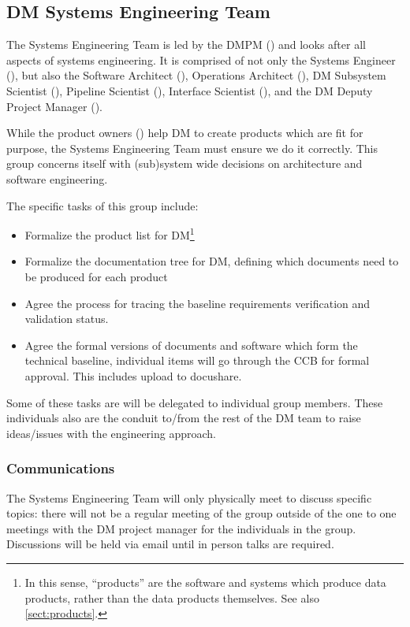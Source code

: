 \subsection{DM Systems Engineering Team \label{sect:sysengt}}

The Systems Engineering Team is led by the DMPM () and looks after all aspects of systems engineering.
It is comprised of not only the Systems Engineer (), but also the Software Architect (), Operations Architect (), DM Subsystem Scientist (), Pipeline Scientist (), Interface Scientist (), and the DM Deputy Project Manager ().

While the product owners () help DM to create products which are fit for purpose, the Systems Engineering Team must ensure we do it correctly. This group concerns itself with (sub)system wide decisions on architecture and software engineering.

The specific tasks of this group include:

\begin{itemize}
\item Formalize the product list for DM\footnote{In this sense, ``products'' are the software and systems which produce data products, rather than the data products themselves. See also \ref{sect:products}.}
\item Formalize the documentation tree for DM, defining which documents need to be produced for each product
\item Agree the process for tracing the baseline requirements verification and validation status.
\item Agree the formal versions of documents and software which form the technical baseline, individual items will go through the CCB for formal approval.  This includes upload to docushare.
\end{itemize}

Some of these tasks are will be delegated to individual group members.
These individuals also are the conduit to/from the rest of the DM team to raise ideas/issues with the engineering approach.

\subsubsection{Communications}

The Systems Engineering Team will only physically meet to discuss specific topics: there will not be a regular meeting of the group outside of the one to one meetings with the DM project manager for the individuals in the group.
Discussions will be held via email until in person talks are required.

